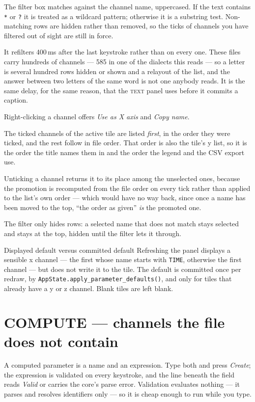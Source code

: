 \documentclass[11pt,a4paper,oneside]{report}
\newcommand{\code}[1]{\texttt{#1}}
\newcommand{\tab}[1]{\textsc{#1}}
\begin{document}
The filter box matches against the channel name, uppercased. If the text
contains \code{*} or \code{?} it is treated as a wildcard pattern; otherwise it
is a substring test. Non-matching rows are hidden rather than removed, so the
ticks of channels you have filtered out of sight are still in force.

It refilters 400\,ms after the last keystroke rather than on every one. These
files carry hundreds of channels --- 585 in one of the dialects this reads ---
so a letter is several hundred rows hidden or shown and a relayout of the list,
and the answer between two letters of the same word is not one anybody reads.
It is the same delay, for the same reason, that the \tab{text} panel uses
before it commits a caption.

Right-clicking a channel offers \emph{Use as X axis} and \emph{Copy name}.

The ticked channels of the active tile are listed \emph{first}, in the order
they were ticked, and the rest follow in file order. That order is also the
tile's y list, so it is the order the title names them in and the order the
legend and the CSV export use.

Unticking a channel returns it to its place among the unselected ones, because
the promotion is recomputed from the file order on every tick rather than
applied to the list's own order --- which would have no way back, since once a
name has been moved to the top, ``the order as given'' \emph{is} the promoted
one.

The filter only hides rows: a selected name that does not match stays selected
and stays at the top, hidden until the filter lets it through.

\begin{aoenote}{Displayed default versus committed default}
Refreshing the panel displays a sensible x channel --- the first whose name
starts with \code{TIME}, otherwise the first channel --- but does not write it to
the tile. The default is committed once per redraw, by
\code{AppState.apply\_parameter\_defaults()}, and only for tiles that already
have a y or z channel. Blank tiles are left blank.
\end{aoenote}

\section{COMPUTE --- channels the file does not contain}

A computed parameter is a name and an expression. Type both and press
\emph{Create}; the expression is validated on every keystroke, and the line
beneath the field reads \emph{Valid} or carries the core's parse error.
Validation evaluates nothing --- it parses and resolves identifiers only --- so
it is cheap enough to run while you type.
\end{document}
